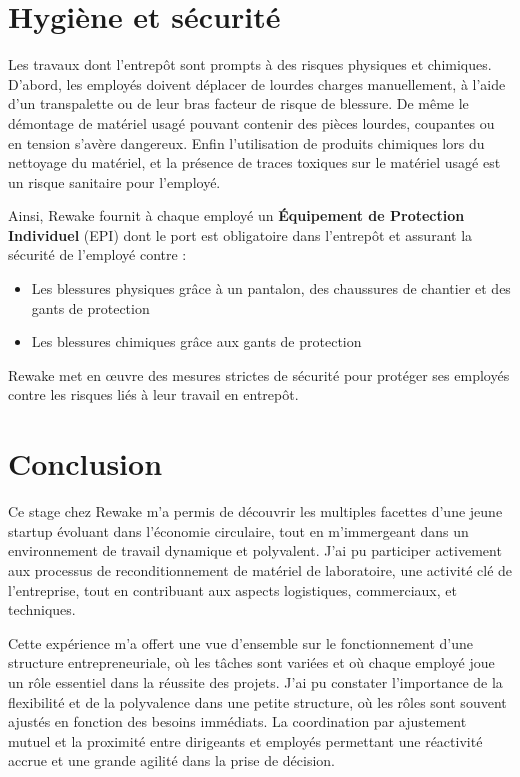 \documentclass{rapportENSCP}
\begin{document}
\section{Hygiène et sécurité}
Les travaux dont l'entrepôt sont prompts à des risques physiques et chimiques. D'abord, les employés doivent déplacer de lourdes charges manuellement, à l'aide d'un transpalette ou de leur bras facteur de risque de blessure. De même le démontage de matériel usagé pouvant contenir des pièces lourdes, coupantes ou en tension s'avère dangereux. Enfin l'utilisation de produits chimiques lors du nettoyage du matériel, et la présence de traces toxiques sur le matériel usagé est un risque sanitaire pour l'employé. 

Ainsi, Rewake fournit à chaque employé un \textbf{Équipement de Protection Individuel} (EPI) dont le port est obligatoire dans l'entrepôt et assurant la sécurité de l'employé contre :
\begin{itemize}
    \item Les blessures physiques grâce à un pantalon, des chaussures de chantier et des gants de protection
    \item Les blessures chimiques grâce aux gants de protection
\end{itemize}

Rewake met en œuvre des mesures strictes de sécurité pour protéger ses employés contre les risques liés à leur travail en entrepôt. 

\section{Conclusion}
Ce stage chez Rewake m’a permis de découvrir les multiples facettes d’une jeune startup évoluant dans l’économie circulaire, tout en m'immergeant dans un environnement de travail dynamique et polyvalent. J’ai pu participer activement aux processus de reconditionnement de matériel de laboratoire, une activité clé de l'entreprise, tout en contribuant aux aspects logistiques, commerciaux, et techniques.

Cette expérience m’a offert une vue d’ensemble sur le fonctionnement d’une structure entrepreneuriale, où les tâches sont variées et où chaque employé joue un rôle essentiel dans la réussite des projets. J’ai pu constater l’importance de la flexibilité et de la polyvalence dans une petite structure, où les rôles sont souvent ajustés en fonction des besoins immédiats. La coordination par ajustement mutuel et la proximité entre dirigeants et employés permettant une réactivité accrue et une grande agilité dans la prise de décision.
\end{document}
